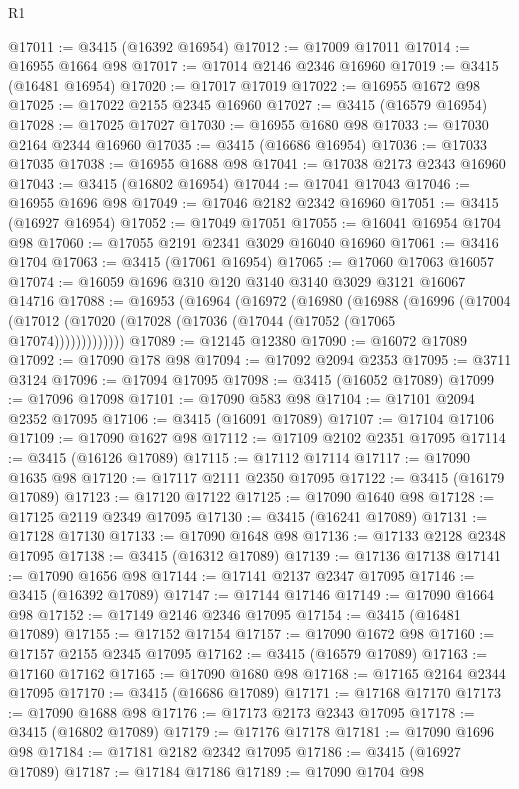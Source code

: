 \begin{lexlean}{R1}
\begin{coremodule}
@17011 := @3415 (@16392 @16954)
@17012 := @17009 @17011
@17014 := @16955 @1664 @98
@17017 := @17014 @2146 @2346 @16960
@17019 := @3415 (@16481 @16954)
@17020 := @17017 @17019
@17022 := @16955 @1672 @98
@17025 := @17022 @2155 @2345 @16960
@17027 := @3415 (@16579 @16954)
@17028 := @17025 @17027
@17030 := @16955 @1680 @98
@17033 := @17030 @2164 @2344 @16960
@17035 := @3415 (@16686 @16954)
@17036 := @17033 @17035
@17038 := @16955 @1688 @98
@17041 := @17038 @2173 @2343 @16960
@17043 := @3415 (@16802 @16954)
@17044 := @17041 @17043
@17046 := @16955 @1696 @98
@17049 := @17046 @2182 @2342 @16960
@17051 := @3415 (@16927 @16954)
@17052 := @17049 @17051
@17055 := @16041 @16954 @1704 @98
@17060 := @17055 @2191 @2341 @3029 @16040 @16960
@17061 := @3416 @1704
@17063 := @3415 (@17061 @16954)
@17065 := @17060 @17063 @16057
@17074 := @16059 @1696 @310 @120 @3140 @3140 @3029 @3121 @16067 @14716
@17088 := @16953
    (@16964
      (@16972
        (@16980
          (@16988
            (@16996
              (@17004 (@17012 (@17020 (@17028 (@17036 (@17044 (@17052 (@17065 @17074)))))))))))))
@17089 := @12145 @12380
@17090 := @16072 @17089
@17092 := @17090 @178 @98
@17094 := @17092 @2094 @2353
@17095 := @3711 @3124
@17096 := @17094 @17095
@17098 := @3415 (@16052 @17089)
@17099 := @17096 @17098
@17101 := @17090 @583 @98
@17104 := @17101 @2094 @2352 @17095
@17106 := @3415 (@16091 @17089)
@17107 := @17104 @17106
@17109 := @17090 @1627 @98
@17112 := @17109 @2102 @2351 @17095
@17114 := @3415 (@16126 @17089)
@17115 := @17112 @17114
@17117 := @17090 @1635 @98
@17120 := @17117 @2111 @2350 @17095
@17122 := @3415 (@16179 @17089)
@17123 := @17120 @17122
@17125 := @17090 @1640 @98
@17128 := @17125 @2119 @2349 @17095
@17130 := @3415 (@16241 @17089)
@17131 := @17128 @17130
@17133 := @17090 @1648 @98
@17136 := @17133 @2128 @2348 @17095
@17138 := @3415 (@16312 @17089)
@17139 := @17136 @17138
@17141 := @17090 @1656 @98
@17144 := @17141 @2137 @2347 @17095
@17146 := @3415 (@16392 @17089)
@17147 := @17144 @17146
@17149 := @17090 @1664 @98
@17152 := @17149 @2146 @2346 @17095
@17154 := @3415 (@16481 @17089)
@17155 := @17152 @17154
@17157 := @17090 @1672 @98
@17160 := @17157 @2155 @2345 @17095
@17162 := @3415 (@16579 @17089)
@17163 := @17160 @17162
@17165 := @17090 @1680 @98
@17168 := @17165 @2164 @2344 @17095
@17170 := @3415 (@16686 @17089)
@17171 := @17168 @17170
@17173 := @17090 @1688 @98
@17176 := @17173 @2173 @2343 @17095
@17178 := @3415 (@16802 @17089)
@17179 := @17176 @17178
@17181 := @17090 @1696 @98
@17184 := @17181 @2182 @2342 @17095
@17186 := @3415 (@16927 @17089)
@17187 := @17184 @17186
@17189 := @17090 @1704 @98

\end{coremodule}
\end{lexlean}
